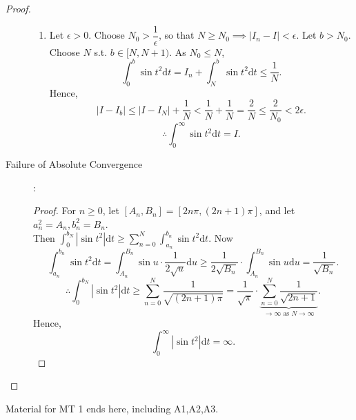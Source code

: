 \begin{example}[1]
\begin{proof}
\begin{description}
\begin{enumerate}
				      \item Let $\epsilon>0$. Choose $N_0>\dfrac{1}{\epsilon}$, so that $N\ge N_0\implies \left|I_n-I\right|<\epsilon$.
				            Let $b> N_0$. Choose $N$ s.t. $b \in [N,N+1)$.
				            As $N_0 \le N$,
				            \[
					            \int_{0}^{b}{\sin{t^2}\mathrm{d}t}=I_n+ \int_{N}^{b}{\sin{t^2}\mathrm{d}t}\le \dfrac{1}{N}
					            .\]
				            Hence, \[
					            \left|I-I_b\right| \le \left|I-I_N\right|+\dfrac{1}{N} <\dfrac{1}{N}+\dfrac{1}{N}= \dfrac{2}{N}\le \dfrac{2}{N_0} <2 \epsilon
					            .\]
				            \[
					            \therefore \int_{0}^{\infty}{\sin{t^2}\mathrm{d}t}=I
					            .\]
			      \end{enumerate}
			\item[Failure of Absolute Convergence]:
			      \begin{proof}
				      For $n\ge 0$, let $[A_n,B_{n}]=[2n\pi,(2n+1)\pi]$, and let $a_n^2=A_n,b_{n}^{2}=B_n$.\\
				      Then $\int_{0}^{b_N}{\left|\sin{t^2}\right|\mathrm{d}t}\ge \sum_{n=0}^{N}{\int_{a_n}^{b_n}{\sin{t^2}\mathrm{d}t}}$.
				      Now
				      \[
					      \int_{a_n}^{b_n}{\sin{t^2}\mathrm{d}t}=\int_{A_n}^{B_n}{\sin{u}\cdot \dfrac{1}{2 \sqrt{u}}\mathrm{d}u}\ge \dfrac{1}{2 \sqrt{B_n}} \cdot  \int_{A_n}^{B_n}{\sin{u}\mathrm{d}u}=\dfrac{1}{\sqrt{B_n}}
					      .\]
				      \[
					      \therefore \int_{0}^{b_N}{\left|\sin{t^2}\right|\mathrm{d}t}\ge \sum_{n=0}^{N}{\frac{1}{\sqrt{(2n+1)\pi}}}= \frac{1}{\sqrt{\pi}}\cdot  \underbrace{\sum_{n=0}^{N}{\frac{1}{\sqrt{2n+1}}}}_{\to \infty \text{ as } N\to \infty}
					      .\]
				      Hence,
				      \[
					      \int_{0}^{\infty}{\left|\sin{t^2}\right|\mathrm{d}t}=\infty
					      .\]
			      \end{proof}
		\end{description}
	\end{proof}
\end{example}

\begin{note}
	Material for MT 1 ends here, including A1,A2,A3.
\end{note}
